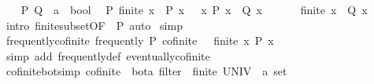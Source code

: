 \begin{isabellebody}
\isamarkupfalse%
\isanewline
\ \ \isamarkupfalse%
\ P\ Q\ {\isacharcolon}{\kern0pt}{\isacharcolon}{\kern0pt}\ {\isachardoublequoteopen}{\isacharprime}{\kern0pt}a\ {\isasymRightarrow}\ bool{\isachardoublequoteclose}\ \isamarkupfalse%
\ P{\isacharcolon}{\kern0pt}\ {\isachardoublequoteopen}finite\ {\isacharbraceleft}{\kern0pt}x{\isachardot}{\kern0pt}\ {\isasymnot}\ P\ x{\isacharbraceright}{\kern0pt}{\isachardoublequoteclose}\ \ {\isacharasterisk}{\kern0pt}{\isacharcolon}{\kern0pt}\ {\isachardoublequoteopen}{\isasymforall}x{\isachardot}{\kern0pt}\ P\ x\ {\isasymlongrightarrow}\ Q\ x{\isachardoublequoteclose}\isanewline
\ \ \isamarkupfalse%
\ {\isacharasterisk}{\kern0pt}\ \isamarkupfalse%
\ {\isachardoublequoteopen}finite\ {\isacharbraceleft}{\kern0pt}x{\isachardot}{\kern0pt}\ {\isasymnot}\ Q\ x{\isacharbraceright}{\kern0pt}{\isachardoublequoteclose}\isanewline
\ \ \ \ \isamarkupfalse%
\ {\isacharparenleft}{\kern0pt}intro\ finite{\isacharunderscore}{\kern0pt}subset{\isacharbrackleft}{\kern0pt}OF\ {\isacharunderscore}{\kern0pt}\ P{\isacharbrackright}{\kern0pt}{\isacharparenright}{\kern0pt}\ auto\isanewline
{}\isamarkupfalse%
\ simp%
\endisatagproof
{\isafoldproof}%
%
\isadelimproof
\isanewline
%
\endisadelimproof
\isanewline
{}\isamarkupfalse%
\ frequently{\isacharunderscore}{\kern0pt}cofinite{\isacharcolon}{\kern0pt}\ {\isachardoublequoteopen}frequently\ P\ cofinite\ {\isasymlongleftrightarrow}\ {\isasymnot}\ finite\ {\isacharbraceleft}{\kern0pt}x{\isachardot}{\kern0pt}\ P\ x{\isacharbraceright}{\kern0pt}{\isachardoublequoteclose}\isanewline
%
\isadelimproof
\ \ %
\endisadelimproof
%
\isatagproof
{}\isamarkupfalse%
\ {\isacharparenleft}{\kern0pt}simp\ add{\isacharcolon}{\kern0pt}\ frequently{\isacharunderscore}{\kern0pt}def\ eventually{\isacharunderscore}{\kern0pt}cofinite{\isacharparenright}{\kern0pt}%
\endisatagproof
{\isafoldproof}%
%
\isadelimproof
\isanewline
%
\endisadelimproof
\isanewline
{}\isamarkupfalse%
\ cofinite{\isacharunderscore}{\kern0pt}bot{\isacharbrackleft}{\kern0pt}simp{\isacharbrackright}{\kern0pt}{\isacharcolon}{\kern0pt}\ {\isachardoublequoteopen}cofinite\ {\isacharequal}{\kern0pt}\ {\isacharparenleft}{\kern0pt}bot{\isacharcolon}{\kern0pt}{\isacharcolon}{\kern0pt}{\isacharprime}{\kern0pt}a\ filter{\isacharparenright}{\kern0pt}\ {\isasymlongleftrightarrow}\ finite\ {\isacharparenleft}{\kern0pt}UNIV\ {\isacharcolon}{\kern0pt}{\isacharcolon}{\kern0pt}\ {\isacharprime}{\kern0pt}a\ set{\isacharparenright}{\kern0pt}{\isachardoublequoteclose}\isanewline

\end{isabellebody}
